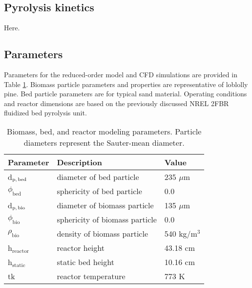 \subsection{Pyrolysis kinetics}

Here.

\subsection{Parameters}

Parameters for the reduced-order model and CFD simulations are provided in Table \ref{tab:params}. Biomass particle parameters and properties are representative of loblolly pine. Bed particle parameters are for typical sand material. Operating conditions and reactor dimensions are based on the previously discussed NREL 2FBR fluidized bed pyrolysis unit.

\begin{table}[ht]
    \centering
    \caption{Biomass, bed, and reactor modeling parameters. Particle diameters represent the Sauter-mean diameter.}
    \begin{tabular}{lll}
        \hline
        Parameter & Description & Value \\
        \hline
        d$_\textrm{p,\,bed}$    & diameter of bed particle          & 235 $\mu$m \\
        $\phi_\textrm{bed}$     & sphericity of bed particle        & 0.0 \\
        d$_\textrm{p,\,bio}$    & diameter of biomass particle      & 135 $\mu$m \\
        $\phi_\textrm{bio}$     & sphericity of biomass particle    & 0.0 \\
        $\rho_\textrm{bio}$     & density of biomass particle       & 540 kg/m$^3$ \\
        h$_\textrm{reactor}$    & reactor height                    & 43.18 cm \\
        h$_\textrm{static}$     & static bed height                 & 10.16 cm\\
        tk                      & reactor temperature               & 773 K \\
        \hline
    \end{tabular}
    \label{tab:params}
\end{table}
